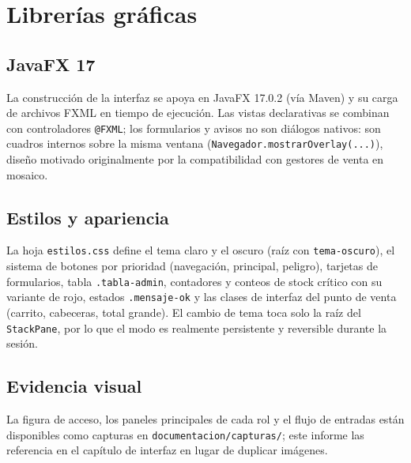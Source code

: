 \chapter{Librerías gráficas}

\section{JavaFX 17}
La construcción de la interfaz se apoya en JavaFX 17.0.2 (vía Maven) y su carga de archivos FXML en tiempo de ejecución. Las vistas declarativas se combinan con controladores \texttt{@FXML}; los formularios y avisos no son diálogos nativos: son cuadros internos sobre la misma ventana (\texttt{Navegador.mostrarOverlay(...)}), diseño motivado originalmente por la compatibilidad con gestores de venta en mosaico.

\section{Estilos y apariencia}
La hoja \texttt{estilos.css} define el tema claro y el oscuro (raíz con \texttt{tema-oscuro}), el sistema de botones por prioridad (navegación, principal, peligro), tarjetas de formularios, tabla \texttt{.tabla-admin}, contadores y conteos de stock crítico con su variante de rojo, estados \texttt{.mensaje-ok} y las clases de interfaz del punto de venta (carrito, cabeceras, total grande). El cambio de tema toca solo la raíz del \texttt{StackPane}, por lo que el modo es realmente persistente y reversible durante la sesión.

\section{Evidencia visual}
La figura de acceso, los paneles principales de cada rol y el flujo de entradas están disponibles como capturas en \texttt{documentacion/capturas/}; este informe las referencia en el capítulo de interfaz en lugar de duplicar imágenes.
